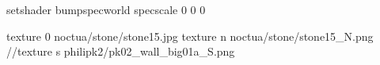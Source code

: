 setshader bumpspecworld
specscale 0 0 0

texture 0 noctua/stone/stone15.jpg
texture n noctua/stone/stone15_N.png
//texture s philipk2/pk02_wall_big01a_S.png
